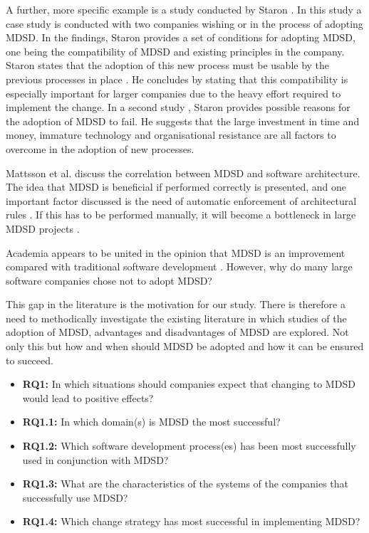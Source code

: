 \documentclass[10pt,twocolumn]{article}
\begin{document}
A further, more specific example is a study conducted by Staron \cite{staron2006adopting}. In this study a case study is conducted with two companies wishing or in the process of adopting MDSD. In the findings, Staron provides a set of conditions for adopting MDSD, one being the compatibility of MDSD and existing principles in the company. Staron states that the adoption of this new process must be usable by the previous processes in place \cite{staron2006adopting}. He concludes by stating that this compatibility is especially important for larger companies due to the heavy effort required to implement the change. In a second study \cite{staron2008transitioning}, Staron provides possible reasons for the adoption of MDSD to fail. He suggests that the large investment in time and money, immature technology and organisational resistance are all factors to overcome in the adoption of new processes.

Mattsson et al. \cite{mattsson2009linking} discuss the correlation between MDSD and software architecture. The idea that MDSD is beneficial if performed correctly is presented, and one important factor discussed is the need of automatic enforcement of architectural rules \cite{mattsson2009linking}. If this has to be performed manually, it will become a bottleneck in large MDSD projects \cite{mattsson2009linking}.


Academia appears to be united in the opinion that MDSD is an improvement compared with traditional software development \cite{staron2006adopting} \cite{volter2013model}. However, why do many large software companies chose not to adopt MDSD?

This gap in the literature is the motivation for our study. There is therefore a need to methodically investigate the existing literature in which studies of the adoption of MDSD, advantages and disadvantages of MDSD are explored. Not only this but how and when should MDSD be adopted and how it can be ensured to succeed.

\begin{itemize}
\item \textbf{RQ1:} In which situations should companies expect that changing to MDSD would lead to positive effects? 
\item \textbf{RQ1.1:} In which domain(s) is MDSD the most successful? 
\item \textbf{RQ1.2:} Which software development process(es) has been most successfully used in conjunction with MDSD?
\item \textbf{RQ1.3:} What are the characteristics of the systems of the companies that successfully use MDSD?
\item \textbf{RQ1.4:} Which change strategy has most successful in implementing MDSD? 
\end{itemize}
\end{document}
